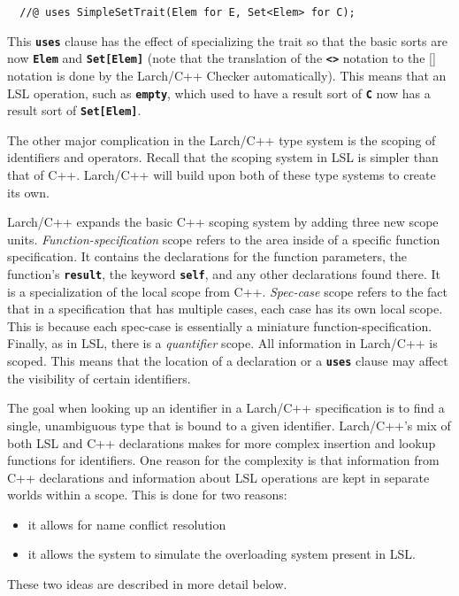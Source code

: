\documentclass[12pt]{article} %
\newcommand{\reserved}[1]{\textbf{\texttt{#1}}} %
\begin{document}
\begin{verbatim}
  //@ uses SimpleSetTrait(Elem for E, Set<Elem> for C);
\end{verbatim}

\noindent This \reserved{uses} clause has the effect of specializing the trait
so that the basic sorts are now \reserved{Elem} and
\reserved{Set[Elem]} (note that the translation of the \reserved{<>}
notation to the [] notation is done by the Larch/C++ Checker
automatically). This means that an LSL operation, such as
\reserved{empty}, which used to have a result sort of \reserved{C} now
has a result sort of \reserved{Set[Elem]}.

The other major complication in the Larch/C++ type system is the
scoping of identifiers and operators. Recall that the scoping system
in LSL is simpler than that of C++. Larch/C++ will build upon both of
these type systems to create its own. 

Larch/C++ expands the basic C++ scoping system by adding three new
scope units. \emph{Function-specification} scope refers to the area
inside of a specific function specification. It contains the
declarations for the function parameters, the function's
\reserved{result}, the keyword \reserved{self}, and any other
declarations found there. It is a specialization of the local scope from
C++. \emph{Spec-case} scope refers to the fact that in a specification
that has multiple cases, each case has its own local scope. This is
because each spec-case is essentially a miniature
function-specification. Finally, as in LSL, there is a
\emph{quantifier} scope. All information in Larch/C++ is scoped. This
means that the location of a declaration or a
\reserved{uses} clause may affect the visibility of certain identifiers.

The goal when looking up an identifier in a Larch/C++ specification is
to find a single, unambiguous type that is bound to a given identifier.
Larch/C++'s mix of both LSL and C++ declarations makes
for more complex insertion and lookup functions for identifiers. One
reason for the complexity is that information from C++ declarations
and information about LSL operations are kept in separate worlds
within a scope. This is done for two reasons:
\begin{itemize} 
\item it allows for name conflict resolution
\item it allows the system to simulate the overloading system present in LSL.
\end{itemize}
\noindent These two ideas are described in more detail below.
\end{document}
